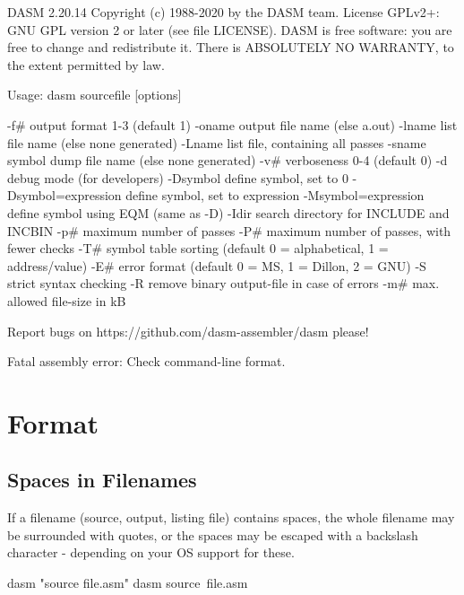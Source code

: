 \label{changelog:20200831help}
\begin{outputx2}
DASM 2.20.14
Copyright (c) 1988-2020 by the DASM team.
License GPLv2+: GNU GPL version 2 or later (see file LICENSE).
DASM is free software: you are free to change and redistribute it.
There is ABSOLUTELY NO WARRANTY, to the extent permitted by law.

Usage: dasm sourcefile [options]

-f#      output format 1-3 (default 1)
-oname   output file name (else a.out)
-lname   list file name (else none generated)
-Lname   list file, containing all passes
-sname   symbol dump file name (else none generated)
-v#      verboseness 0-4 (default 0)
-d       debug mode (for developers)
-Dsymbol              define symbol, set to 0
-Dsymbol=expression   define symbol, set to expression
-Msymbol=expression   define symbol using EQM (same as -D)
-Idir    search directory for INCLUDE and INCBIN
-p#      maximum number of passes
-P#      maximum number of passes, with fewer checks
-T#      symbol table sorting
         (default 0 = alphabetical, 1 = address/value)
-E#      error format (default 0 = MS, 1 = Dillon, 2 = GNU)
-S       strict syntax checking
-R       remove binary output-file in case of errors
-m#      max. allowed file-size in kB

Report bugs on https://github.com/dasm-assembler/dasm please!


Fatal assembly error: Check command-line format.
\end{outputx2}





\section{Format}
\subsection{Spaces in Filenames}
\label{changelog:20200906spaces}

If a filename (source, output, listing file) contains spaces, the whole filename may be surrounded with quotes, or the spaces may be escaped with a backslash character - depending on your OS support for these.

\begin{usage}
dasm "source file.asm"
dasm source\ file.asm
\end{usage}




